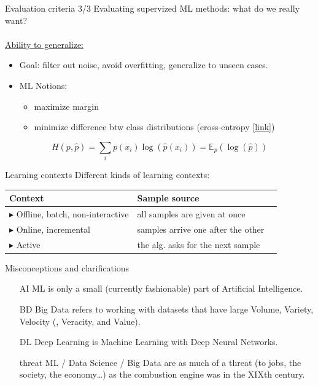 \documentclass{beamer}
\begin{document}
\begin{frame}{Evaluation criteria 3/3}
Evaluating supervized ML methods: what do we really want?\\
~\\
\underline{Ability to generalize:}
\begin{itemize}
\item Goal: filter out noise, avoid overfitting, generalize to unseen cases.
\item ML Notions:
\begin{itemize}
\item maximize margin
\item minimize difference btw class distributions (cross-entropy \href{https://en.wikipedia.org/wiki/Cross_entropy}{[link]})
\end{itemize}
\end{itemize}
$$H(p,\hat{p}) = \sum_i p(x_i) \log (\hat{p}(x_i)) = \mathbb{E}_p \left(\log(\hat{p})\right)$$
\end{frame}

\begin{frame}{Learning contexts}
Different kinds of learning contexts:\\
\hspace{0.1cm}
\begin{tabular}{lll}
Context & Sample source \\
\hline
{\scriptsize $\blacktriangleright$} Offline, batch, non-interactive & all samples are given at once\\
{\scriptsize $\blacktriangleright$} Online, incremental & samples arrive one after the other\\
{\scriptsize $\blacktriangleright$} Active & the alg. asks for the next sample
\end{tabular}
\end{frame}

\begin{frame}{Misconceptions and clarifications}
\begin{itemize}
\item[AI] ML is only a small (currently fashionable) part of Artificial Intelligence.
\item[BD] Big Data refers to working with datasets that have large Volume, Variety, Velocity (, Veracity, and Value).
\item[DL] Deep Learning is Machine Learning with Deep Neural Networks.
\item[threat] ML / Data Science / Big Data are as much of a threat (to jobs, the society, the economy\ldots) as the combustion engine was in the XIXth century.
\end{itemize}
\end{frame}
\end{document}
